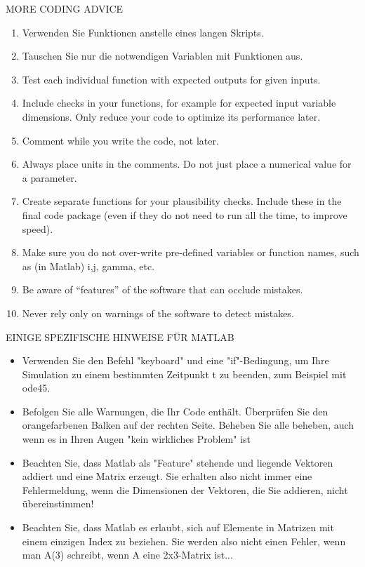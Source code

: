 MORE CODING ADVICE
\begin{enumerate}
    \item Verwenden Sie Funktionen anstelle eines langen Skripts. 
    \item Tauschen Sie nur die notwendigen Variablen mit Funktionen aus.
    \item Test each individual function with expected outputs for given inputs. 
    \item Include checks in your functions, for example for expected input variable dimensions. Only 
reduce your code to optimize its performance later.
    \item Comment while you write the code, not later. 
    \item  Always place units in the comments. Do not just place a numerical value for a parameter. 
    \item Create separate functions for your plausibility checks. Include these in the final code package 
(even if they do not need to run all the time, to improve speed).
    \item Make sure you do not over-write pre-defined variables or function names, such as (in Matlab) 
i,j, gamma, etc.
    \item Be aware of “features” of the software that can occlude mistakes. 
  \item  Never rely only on warnings of the software to detect mistakes.
\end{enumerate}


EINIGE SPEZIFISCHE HINWEISE FÜR MATLAB
\begin{itemize}
    \item Verwenden Sie den Befehl "keyboard" und eine "if"-Bedingung, um Ihre Simulation zu einem bestimmten Zeitpunkt t zu beenden, 
zum Beispiel mit ode45. 
\item Befolgen Sie alle Warnungen, die Ihr Code enthält. Überprüfen Sie den orangefarbenen Balken auf der rechten Seite. Beheben Sie alle 
beheben, auch wenn es in Ihren Augen "kein wirkliches Problem" ist
\item Beachten Sie, dass Matlab als "Feature" stehende und liegende Vektoren addiert und eine Matrix erzeugt. Sie erhalten also nicht immer eine Fehlermeldung, wenn die Dimensionen der Vektoren, die Sie addieren, nicht übereinstimmen! 
\item Beachten Sie, dass Matlab es erlaubt, sich auf Elemente in Matrizen mit einem einzigen Index zu beziehen. Sie werden also nicht 
einen Fehler, wenn man A(3) schreibt, wenn A eine 2x3-Matrix ist...
\end{itemize}





